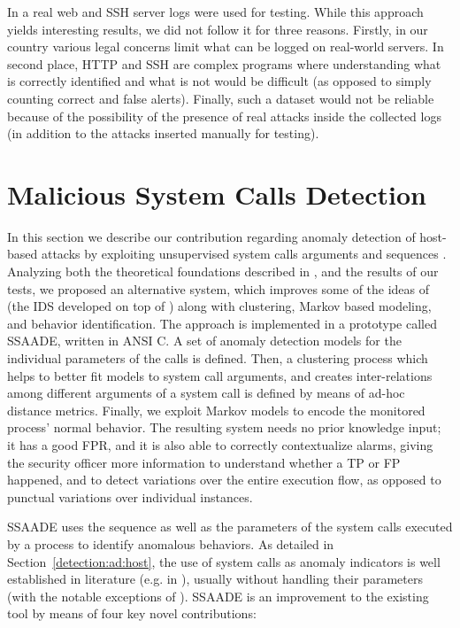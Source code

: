In \citep{venkat_dataflow} a real web and \ac{SSH} server
logs were used for testing. While this approach yields interesting
results, we did not follow it for three reasons. Firstly, in our
country various legal concerns limit what can be logged on real-world
servers. In second place, \ac{HTTP} and
\ac{SSH} are complex programs where understanding what is
correctly identified and what is not would be difficult (as opposed to
simply counting correct and false alerts). Finally, such a dataset
would not be reliable because of the possibility of the presence of
real attacks inside the collected logs (in addition to the attacks
inserted manually for testing).

\section{Malicious System Calls Detection}
\label{host:syscall}
In this section we describe our contribution regarding anomaly
detection of host-based attacks by exploiting unsupervised system
calls arguments and sequences \citep{10.1109/TDSC.2008.69}. Analyzing
both the theoretical foundations described in
\citep{libanomaly,mutz06:syscalls}, and the results of our tests, we
proposed an alternative system, which improves some of the ideas of
\SyscallAnomaly (the \ac{IDS} developed on top of \LibAnomaly) along
with clustering, Markov based modeling, and behavior
identification. The approach is implemented in a prototype called
\ac{SSAADE}, written in \ac{ANSI} C. A set of anomaly
detection models for the individual parameters of the calls is
defined. Then, a clustering process which helps to better fit models
to system call arguments, and creates inter-relations among different
arguments of a system call is defined by means of ad-hoc distance
metrics. Finally, we exploit Markov models to encode the monitored
process' normal behavior. The resulting system needs no prior
knowledge input; it has a good \ac{FPR}, and it is also able to
correctly contextualize alarms, giving the security officer more
information to understand whether a \ac{TP} or \ac{FP} happened, and
to detect variations over the entire execution flow, as opposed to
punctual variations over individual instances.

\ac{SSAADE} uses the sequence as well as the parameters of the system
calls executed by a process to identify anomalous behaviors. As
detailed in Section~\ref{detection:ad:host}, the use of system calls
as anomaly indicators is well established in literature (e.g. in
\citep{Self,DetClassSequences,seqsys,System-CallDelays,Ripper,stolfo,HMMDetecting,markov-simile,State-basedDetection,sekar:sp2001:automaton,wagner:sp2001:staticanalysis,giffin,ding}),
usually without handling their parameters (with the notable exceptions
of
\citep{libanomaly,rulessystemcallarguments,venkat_dataflow}). \ac{SSAADE}
is an improvement to the existing tool by means of four key novel
contributions:

